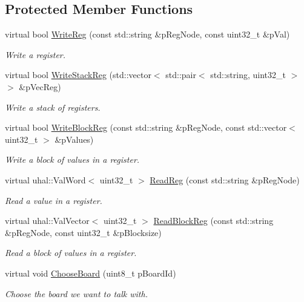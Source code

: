 \subsection*{Protected Member Functions}
\begin{DoxyCompactItemize}
\item 
virtual bool \hyperlink{class_ph2___hw_interface_1_1_reg_manager_a31174516fef6706c88c3f59dd93e4fdf}{Write\-Reg} (const std\-::string \&p\-Reg\-Node, const uint32\-\_\-t \&p\-Val)
\begin{DoxyCompactList}\small\item\em Write a register. \end{DoxyCompactList}\item 
virtual bool \hyperlink{class_ph2___hw_interface_1_1_reg_manager_ac67c49c17b1c171ef9836ae463d8bc18}{Write\-Stack\-Reg} (std\-::vector$<$ std\-::pair$<$ std\-::string, uint32\-\_\-t $>$ $>$ \&p\-Vec\-Reg)
\begin{DoxyCompactList}\small\item\em Write a stack of registers. \end{DoxyCompactList}\item 
virtual bool \hyperlink{class_ph2___hw_interface_1_1_reg_manager_a888f5cccb05daa28896cf622abfdcbd6}{Write\-Block\-Reg} (const std\-::string \&p\-Reg\-Node, const std\-::vector$<$ uint32\-\_\-t $>$ \&p\-Values)
\begin{DoxyCompactList}\small\item\em Write a block of values in a register. \end{DoxyCompactList}\item 
virtual uhal\-::\-Val\-Word$<$ uint32\-\_\-t $>$ \hyperlink{class_ph2___hw_interface_1_1_reg_manager_a077e0a18592206365150680213345112}{Read\-Reg} (const std\-::string \&p\-Reg\-Node)
\begin{DoxyCompactList}\small\item\em Read a value in a register. \end{DoxyCompactList}\item 
virtual uhal\-::\-Val\-Vector$<$ uint32\-\_\-t $>$ \hyperlink{class_ph2___hw_interface_1_1_reg_manager_a6481c211d27badc409ff0e7af20575e4}{Read\-Block\-Reg} (const std\-::string \&p\-Reg\-Node, const uint32\-\_\-t \&p\-Blocksize)
\begin{DoxyCompactList}\small\item\em Read a block of values in a register. \end{DoxyCompactList}\item 
virtual void \hyperlink{class_ph2___hw_interface_1_1_reg_manager_a20c502bcad5115c6ae16d4d356b72f0c}{Choose\-Board} (uint8\-\_\-t p\-Board\-Id)
\begin{DoxyCompactList}\small\item\em Choose the board we want to talk with. \end{DoxyCompactList}\end{DoxyCompactItemize}
